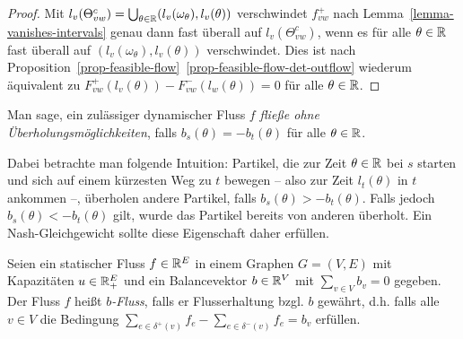 \begin{proof}
	Mit $l_v(\Theta_{vw}^c) = \bigcup_{\theta\in\mathbb{R}}(l_v(\omega_\theta),l_v(\theta))$ verschwindet $f_{vw}^+$ nach Lemma~\ref{lemma-vanishes-intervals} genau dann fast überall auf $l_v(\Theta_{vw}^c)$, wenn es für alle $\theta\in\mathbb{R}$ fast überall auf $(l_v(\omega_\theta),l_v(\theta))$ verschwindet.
	Dies ist nach Proposition~\ref{prop-feasible-flow}~\ref{prop-feasible-flow-det-outflow} wiederum äquivalent zu
	$F_{vw}^+(l_v(\theta))-F_{vw}^-(l_w(\theta))=0$ für alle $\theta\in\mathbb{R}$.
\end{proof}

\begin{definition}
	Man sage, ein zulässiger dynamischer Fluss $f$ \emph{fließe ohne Über\-holungs\-möglichkeiten}, falls $b_s(\theta) = -b_t(\theta)$ für alle $\theta\in\mathbb{R}$.
\end{definition}

Dabei betrachte man folgende Intuition:
 Partikel, die zur Zeit $\theta\in\mathbb{R}$ bei $s$ starten und sich auf einem kürzesten Weg zu $t$ bewegen  -- also zur Zeit $l_t(\theta)$ in $t$ ankommen --, überholen andere Partikel, falls $b_s(\theta) > -b_t(\theta)$.
Falls jedoch $b_s(\theta) < - b_t(\theta)$ gilt, wurde das Partikel bereits von anderen überholt.
Ein Nash-Gleichgewicht sollte diese Eigenschaft daher erfüllen.

\begin{definition}
	Seien ein statischer Fluss $f \in \mathbb{R}^E$ in einem Graphen $G=(V,E)$ mit Kapazitäten $u\in \mathbb{R}_+^E$ und ein Balancevektor $b\in\mathbb{R}^V$ mit $\sum_{v\in V} b_v = 0$ gegeben.
	Der Fluss $f$ heißt \emph{$b$-Fluss}, falls er Flusserhaltung bzgl. $b$ gewährt, d.h. falls alle $v\in V$ die Bedingung $\sum_{e\in\delta^+(v)}f_e - \sum_{e\in\delta^-(v)}f_e = b_v$ erfüllen.
\end{definition}

